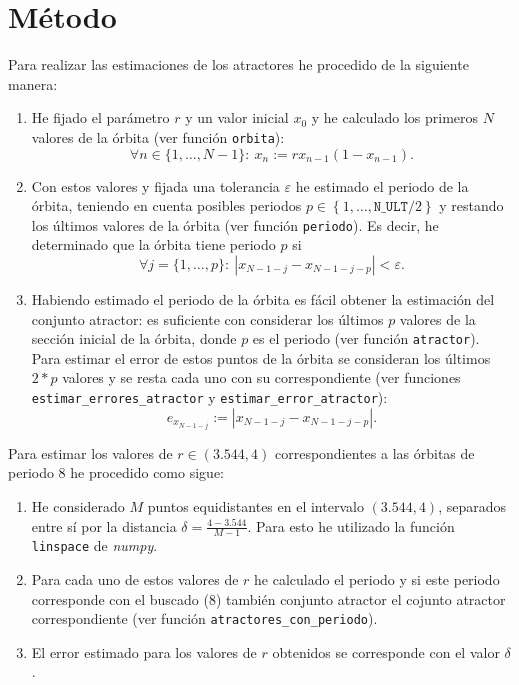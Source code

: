 \documentclass[10pt, spanish]{article}
\theoremstyle{definition}
\theoremstyle{break}
\begin{document}
\section{Método}

Para realizar las estimaciones de los atractores he procedido de la siguiente manera:
\begin{enumerate}
    \item He fijado el parámetro $r$ y un valor inicial $x_0$ y he calculado los
        primeros $N$ valores de la órbita (ver función \texttt{orbita}):
        \[\forall n\in\{1,\ldots,N-1\}:\ x_n := rx_{n-1}(1-x_{n-1}).\] 
    \item Con estos valores y fijada una tolerancia $\varepsilon$ he estimado el
        periodo de la órbita, teniendo en cuenta posibles periodos $p\in\left\{
        1,\ldots, \texttt{N\_ULT}/2 \right\} $ y
        restando los últimos valores de la órbita (ver función
        \texttt{periodo}). Es decir, he determinado que la órbita tiene periodo
        $p$ si
        \[\forall j = \{1, \ldots, p\}:\ \left| x_{N-1-j}-x_{N-1-j-p} \right| <\varepsilon.\]
    \item Habiendo estimado el periodo de la órbita es fácil obtener la
        estimación del conjunto atractor: es suficiente con considerar los
        últimos $p$ valores de la sección inicial de la órbita, donde $p$ es el
        periodo (ver función \texttt{atractor}). Para estimar el error de estos puntos de la órbita se
        consideran los últimos $2*p$ valores y se resta cada uno con su
        correspondiente (ver funciones \texttt{estimar\_errores\_atractor} y
        \texttt{estimar\_error\_atractor}):
        \[e_{x_{N-1-j}}:=\left|x_{N-1-j}-x_{N-1-j-p}\right|.\]
\end{enumerate}

Para estimar los valores de $r\in(3.544, 4)$ correspondientes a las órbitas de periodo 8 he
procedido como sigue:
\begin{enumerate}
    \item He considerado $M$ puntos equidistantes en el intervalo $(3.544,4)$,
        separados entre sí por la distancia $\delta = \frac{4-3.544}{M-1}$. Para
        esto he utilizado la función \texttt{linspace} de \textit{numpy}.
    \item Para cada uno de estos valores de $r$ he calculado el periodo y si
        este periodo corresponde con el buscado (8) también conjunto atractor el
        cojunto atractor correspondiente (ver función
        \texttt{atractores\_con\_periodo}).
    \item El error estimado para los valores de $r$ obtenidos se corresponde con
        el valor $\delta$.
\end{enumerate} 
\end{document}
